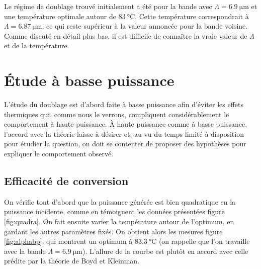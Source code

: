 \documentclass[11pt,a4paper]{article}
\begin{document}



Le régime de doublage trouvé initialement a été pour la bande avec $\Lambda = \SI{6.9}{\micro\meter}$ et une température optimale autour de $\SI{83}{\celsius}$. Cette température correspondrait à $\Lambda=\SI{6.87}{\micro\meter}$, ce qui reste supérieur à la valeur annoncée pour la bande voisine. Comme discuté en détail plus bas, il est difficile de connaître la vraie valeur de $\Lambda$ et de la température.

\section{Étude à basse puissance}

L'étude du doublage est d'abord faite à basse puissance afin d'éviter les effets thermiques qui, comme nous le verrons, compliquent considérablement le comportement à haute puissance. À haute puissance comme à basse puissance, l'accord avec la théorie laisse à désirer et, au vu du temps limité à disposition pour étudier la question, on doit se contenter de proposer des hypothèses pour expliquer le comportement observé.

\subsection{Efficacité de conversion} 

On vérifie tout d'abord que la puissance générée est bien quadratique en la puissance incidente, comme en témoignent les données présentées figure \ref{fig:quadra}. On fait ensuite varier la température autour de l'optimum, en gardant les autres paramètres fixés. On obtient alors les mesures figure \ref{fig:alphabp}, qui montrent un optimum à $\SI{83.3}{\celsius}$ (on rappelle que l'on travaille avec la bande $\Lambda = \SI{6.9}{\micro\meter}$). L'allure de la courbe est plutôt en accord avec celle prédite par la théorie de Boyd et Kleinman. 
\end{document}
